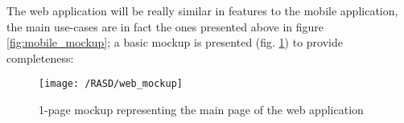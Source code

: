 The web application will be really similar in features to the mobile application, the main use-cases are in fact the ones presented above in figure \ref{fig:mobile_mockup}; a basic mockup is presented (fig. \ref{fig:web_mockup}) to provide completeness:
\begin{figure}[!ht]
	\centering
	\vspace{0.2cm}{}
	\texttt{[image: /RASD/web\_mockup]}\\ 
	\vspace{0.5cm}
	\caption{1-page mockup representing the main page of the web application} \label{fig:web_mockup} 
\end{figure}
